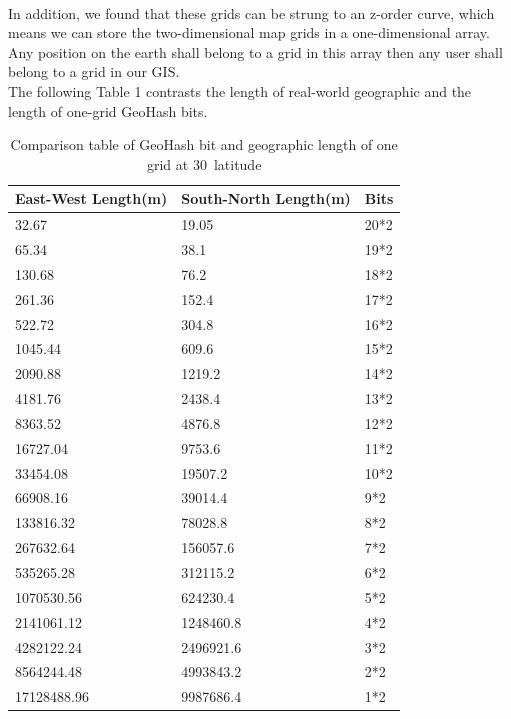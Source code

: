 \documentclass[sigplan,screen]{acmart}
\begin{document}
\\
In addition, we found that these grids can be strung to an z-order curve, which means we can store the two-dimensional map grids in a one-dimensional array.
Any position on the earth shall belong to a grid in this array then any user shall belong to a grid in our GIS.
\\
The following Table 1 contrasts the length of real-world geographic and the length of one-grid GeoHash bits.
\begin{table}[htb]
    \caption{Comparison table of GeoHash bit and geographic length of one grid at 30\degree\ latitude}
    \begin{tabular}{lll}
        \toprule
        East-West Length(m) & South-North Length(m) & Bits \\
        \midrule
        32.67               & 19.05                 & 20*2          \\
        65.34               & 38.1                  & 19*2          \\
        130.68              & 76.2                  & 18*2          \\
        261.36              & 152.4                 & 17*2          \\
        522.72              & 304.8                 & 16*2          \\
        1045.44             & 609.6                 & 15*2          \\
        2090.88             & 1219.2                & 14*2          \\
        4181.76             & 2438.4                & 13*2          \\
        8363.52             & 4876.8                & 12*2          \\
        16727.04            & 9753.6                & 11*2          \\
        33454.08            & 19507.2               & 10*2          \\
        66908.16            & 39014.4               & 9*2           \\
        133816.32           & 78028.8               & 8*2           \\
        267632.64           & 156057.6              & 7*2           \\
        535265.28           & 312115.2              & 6*2           \\
        1070530.56          & 624230.4              & 5*2           \\
        2141061.12          & 1248460.8             & 4*2           \\
        4282122.24          & 2496921.6             & 3*2           \\
        8564244.48          & 4993843.2             & 2*2           \\
        17128488.96         & 9987686.4             & 1*2           \\
        \bottomrule
    \end{tabular}
\end{table}
\end{document}
